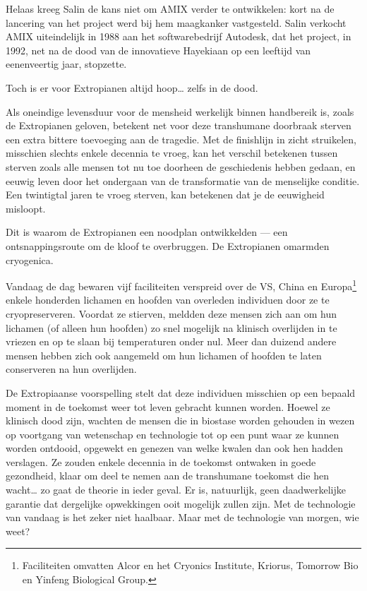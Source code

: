 \documentclass[smalldemyvopaper,11pt,twoside,onecolumn,openright,extrafontsizes,hidelinks]{memoir}
\begin{document}
Helaas kreeg Salin de kans niet om AMIX verder te ontwikkelen: kort na
de lancering van het project werd bij hem maagkanker vastgesteld. Salin
verkocht AMIX uiteindelijk in 1988 aan het softwarebedrijf Autodesk, dat
het project, in 1992, net na de dood van de innovatieve Hayekiaan op een
leeftijd van eenenveertig jaar, stopzette.

Toch is er voor Extropianen altijd hoop\ldots{} zelfs in de dood.

Als oneindige levensduur voor de mensheid werkelijk binnen handbereik
is, zoals de Extropianen geloven, betekent net voor deze transhumane
doorbraak sterven een extra bittere toevoeging aan de tragedie. Met de
finishlijn in zicht struikelen, misschien slechts enkele decennia te
vroeg, kan het verschil betekenen tussen sterven zoals alle mensen tot
nu toe doorheen de geschiedenis hebben gedaan, en eeuwig leven door het
ondergaan van de transformatie van de menselijke conditie. Een
twintigtal jaren te vroeg sterven, kan betekenen dat je de eeuwigheid
misloopt.

Dit is waarom de Extropianen een noodplan ontwikkelden --- een
ontsnappingsroute om de kloof te overbruggen. De Extropianen omarmden
cryogenica.

Vandaag de dag bewaren vijf faciliteiten verspreid over de VS, China en
Europa\footnote{Faciliteiten omvatten Alcor en het Cryonics Institute,
  Kriorus, Tomorrow Bio en Yinfeng Biological Group.} enkele honderden
lichamen en hoofden van overleden individuen door ze te cryopreserveren.
Voordat ze stierven, meldden deze mensen zich aan om hun lichamen (of
alleen hun hoofden) zo snel mogelijk na klinisch overlijden in te
vriezen en op te slaan bij temperaturen onder nul. Meer dan duizend
andere mensen hebben zich ook aangemeld om hun lichamen of hoofden te
laten conserveren na hun overlijden.

De Extropiaanse voorspelling stelt dat deze individuen misschien op een
bepaald moment in de toekomst weer tot leven gebracht kunnen worden.
Hoewel ze klinisch dood zijn, wachten de mensen die in biostase worden
gehouden in wezen op voortgang van wetenschap en technologie tot op een
punt waar ze kunnen worden ontdooid, opgewekt en genezen van welke
kwalen dan ook hen hadden verslagen. Ze zouden enkele decennia in de
toekomst ontwaken in goede gezondheid, klaar om deel te nemen aan de
transhumane toekomst die hen wacht\ldots{} zo gaat de theorie in ieder
geval. Er is, natuurlijk, geen daadwerkelijke garantie dat dergelijke
opwekkingen ooit mogelijk zullen zijn. Met de technologie van vandaag is
het zeker niet haalbaar. Maar met de technologie van morgen, wie weet?
\end{document}

